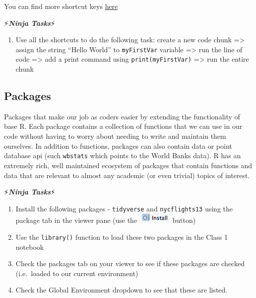 \documentclass[]{article}
\providecommand{\tightlist}{%
  \setlength{\itemsep}{0pt}\setlength{\parskip}{0pt}}
\begin{document}
You can find more shortcut keys
\href{https://support.rstudio.com/hc/en-us/articles/200711853-Keyboard-Shortcuts}{here}

⚡\textbf{\emph{Ninja Tasks}}⚡

\begin{enumerate}
\def\labelenumi{\arabic{enumi}.}
\tightlist
\item
  Use all the shortcuts to do the following task: create a new code
  chunk =\textgreater{} assign the string ``Hello World'' to
  \texttt{myFirstVar} variable =\textgreater{} run the line of code
  =\textgreater{} add a print command using \texttt{print(myFirstVar)}
  =\textgreater{} run the entire chunk
\end{enumerate}

\subsection{Packages}\label{packages}

Packages that make our job as coders easier by extending the
functionality of base R. Each package contains a collection of functions
that we can use in our code without having to worry about needing to
write and maintain them ourselves. In addition to functions, packages
can also contain data or point database api (such \texttt{wbstats} which
points to the World Banks data). R has an extremely rich, well
maintained ecosystem of packages that contain functions and data that
are relevant to almost any academic (or even trivial) topics of
interest.

⚡\textbf{\emph{Ninja Tasks}}⚡

\begin{enumerate}
\def\labelenumi{\arabic{enumi}.}
\tightlist
\item
  Install the following packages - \texttt{tidyverse} and
  \texttt{nycflights13} using the package tab in the viewer pane (use
  the \includegraphics{assets/install.png} button)
\item
  Use the \texttt{library()} function to load these two packages in the
  Class 1 notebook
\item
  Check the packages tab on your viewer to see if these packages are
  checked (i.e.~loaded to our current environment)
\item
  Check the Global Environment dropdown to see that these are listed.
\end{enumerate}
\end{document}
